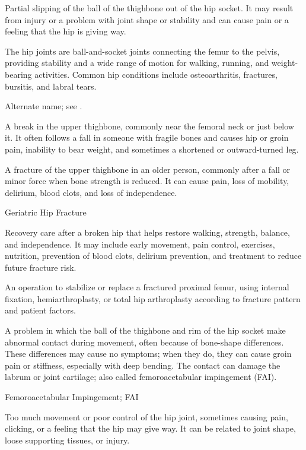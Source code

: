  Partial slipping of the ball of the thighbone out of the hip socket. It may result from injury or a problem with joint shape or stability and can cause pain or a feeling that the hip is giving way.

 The hip joints are ball-and-socket joints connecting the femur to the pelvis, providing
stability and a wide range of motion for walking, running, and weight-bearing
activities. Common hip conditions include osteoarthritis, fractures, bursitis, and
labral tears.

 Alternate name; see .

 A break in the upper thighbone, commonly near the femoral neck or just below it. It often follows a fall in someone with fragile bones and causes hip or groin pain, inability to bear weight, and sometimes a shortened or outward-turned leg.

 A fracture of the upper thighbone in an older person, commonly after a fall or minor force when bone strength is reduced. It can cause pain, loss of mobility, delirium, blood clots, and loss of independence.

\synonyms
Geriatric Hip Fracture

 Recovery care after a broken hip that helps restore walking, strength, balance, and independence. It may include early movement, pain control, exercises, nutrition, prevention of blood clots, delirium prevention, and treatment to reduce future fracture risk.

 An operation to stabilize or replace a fractured proximal femur, using internal fixation, hemiarthroplasty, or total hip arthroplasty according to fracture pattern and patient factors.

 A problem in which the ball of the thighbone and rim of the hip socket make abnormal contact during movement, often because of bone-shape differences. These differences may cause no symptoms; when they do, they can cause groin pain or stiffness, especially with deep bending. The contact can damage the labrum or joint cartilage; also called femoroacetabular impingement (FAI).

\synonyms
Femoroacetabular Impingement; FAI

 Too much movement or poor control of the hip joint, sometimes causing pain, clicking, or a feeling that the hip may give way. It can be related to joint shape, loose supporting tissues, or injury.

